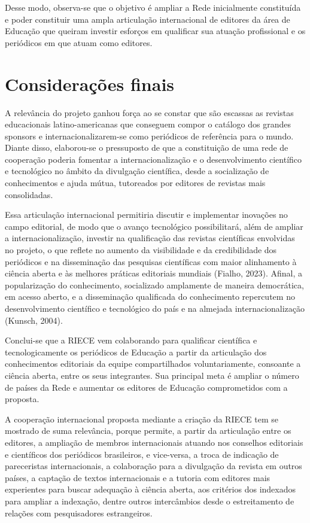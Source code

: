 \documentclass[
  a4paper,
]{book}
\begin{document}
Desse modo, observa-se que o objetivo é ampliar a Rede inicialmente
constituída e poder constituir uma ampla articulação internacional de
editores da área de Educação que queiram investir esforços em qualificar
sua atuação profissional e os periódicos em que atuam como editores.

\section{Considerações finais}\label{considerauxe7uxf5es-finais}

A relevância do projeto ganhou força ao se constar que são escassas as
revistas educacionais latino-americanas que conseguem compor o catálogo
dos grandes sponsors e internacionalizarem-se como periódicos de
referência para o mundo. Diante disso, elaborou-se o pressuposto de que
a constituição de uma rede de cooperação poderia fomentar a
internacionalização e o desenvolvimento científico e tecnológico no
âmbito da divulgação científica, desde a socialização de conhecimentos e
ajuda mútua, tutoreados por editores de revistas mais consolidadas.

Essa articulação internacional permitiria discutir e implementar
inovações no campo editorial, de modo que o avanço tecnológico
possibilitará, além de ampliar a internacionalização, investir na
qualificação das revistas científicas envolvidas no projeto, o que
reflete no aumento da visibilidade e da credibilidade dos periódicos e
na disseminação das pesquisas científicas com maior alinhamento à
ciência aberta e às melhores práticas editoriais mundiais (Fialho,
2023). Afinal, a popularização do conhecimento, socializado amplamente
de maneira democrática, em acesso aberto, e a disseminação qualificada
do conhecimento repercutem no desenvolvimento científico e tecnológico
do país e na almejada internacionalização (Kunsch, 2004).

Conclui-se que a RIECE vem colaborando para qualificar científica e
tecnologicamente os periódicos de Educação a partir da articulação dos
conhecimentos editoriais da equipe compartilhados voluntariamente,
consoante a ciência aberta, entre os seus integrantes. Sua principal
meta é ampliar o número de países da Rede e aumentar os editores de
Educação comprometidos com a proposta.

A cooperação internacional proposta mediante a criação da RIECE tem se
mostrado de suma relevância, porque permite, a partir da articulação
entre os editores, a ampliação de membros internacionais atuando nos
conselhos editoriais e científicos dos periódicos brasileiros, e
vice-versa, a troca de indicação de pareceristas internacionais, a
colaboração para a divulgação da revista em outros países, a captação de
textos internacionais e a tutoria com editores mais experientes para
buscar adequação à ciência aberta, aos critérios dos indexados para
ampliar a indexação, dentre outros intercâmbios desde o estreitamento de
relações com pesquisadores estrangeiros.
\end{document}
